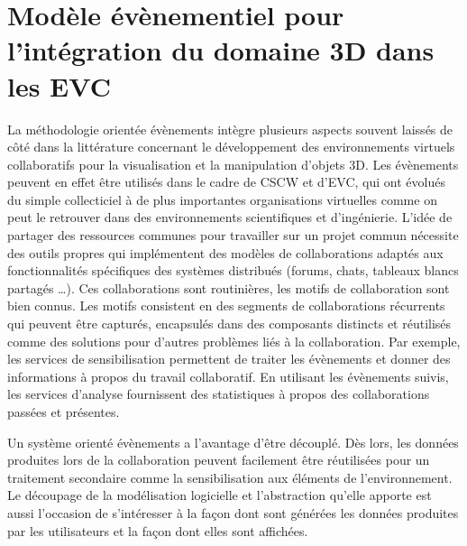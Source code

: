 
\section{Modèle évènementiel pour l'intégration du domaine 3D dans les 
EVC}

La méthodologie orientée évènements intègre plusieurs aspects souvent laissés 
de côté dans la littérature concernant le développement des environnements 
virtuels collaboratifs pour la visualisation et la manipulation d'objets 3D. 
Les évènements peuvent en effet être utilisés dans le cadre de \gls{CSCW} et 
d'\gls{EVC}, qui ont évolués du simple collecticiel à de plus importantes 
organisations virtuelles comme on peut le retrouver dans des environnements 
scientifiques et d'ingénierie. L'idée de partager des ressources communes pour 
travailler sur un projet commun nécessite des outils propres qui implémentent 
des modèles de collaborations adaptés aux fonctionnalités spécifiques des 
systèmes distribués (forums, chats, tableaux blancs partagés \dots). Ces 
collaborations sont routinières, les motifs de collaboration sont bien connus. Les 
motifs consistent en des segments de collaborations récurrents qui peuvent être 
capturés, encapsulés dans des composants distincts et réutilisés comme des 
solutions pour d'autres problèmes liés à la collaboration. Par exemple, les services 
de sensibilisation permettent de traiter les évènements et donner des informations 
à propos du travail collaboratif. En utilisant les évènements suivis, les services 
d'analyse fournissent des statistiques à propos des collaborations passées et 
présentes.


Un système orienté évènements a l'avantage d'être découplé. Dès 
lors, les données produites lors de la collaboration peuvent facilement être 
réutilisées pour un traitement secondaire comme la sensibilisation aux éléments 
de l'environnement. 
Le découpage de la modélisation logicielle et l'abstraction qu'elle apporte est aussi 
l'occasion de s'intéresser à la façon dont sont générées les données produites par 
les utilisateurs et la façon dont elles sont affichées. 

